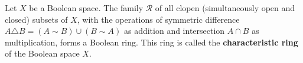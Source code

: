 Let $X$ be a Boolean space. The family $\mathcal{R}$ of all clopen (simultaneously open and closed) subsets of $X$, with the operations of symmetric difference $A \triangle B = (A \sim B) \cup (B \sim A)$ as addition and intersection $A \cap B$ as multiplication, forms a Boolean ring. This ring is called the \textbf{characteristic ring} of the Boolean space $X$.

